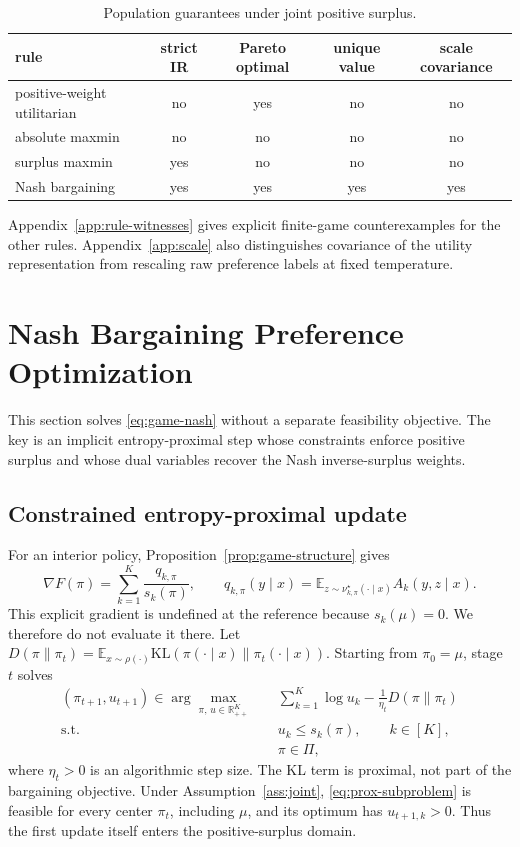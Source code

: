 \documentclass{article}
\theoremstyle{remark}
\theoremstyle{plain}
\newcommand{\KL}{\mathrm{KL}}
\newcommand{\E}{\mathbb{E}}
\newcommand{\R}{\mathbb{R}}
\begin{document}
\begin{table}[htbp]
\centering\footnotesize
\setlength{\tabcolsep}{4.4pt}
\caption{Population guarantees under joint positive surplus.}
\label{tab:rule-guarantees}
\begin{tabular}{lcccc}
\toprule
rule & strict IR & Pareto optimal & unique value & scale covariance\\
\midrule
positive-weight utilitarian & no & yes & no & no\\
absolute maxmin & no & no & no & no\\
surplus maxmin & yes & no & no & no\\
Nash bargaining & yes & yes & yes & yes\\
\bottomrule
\end{tabular}
\end{table}
Appendix~\ref{app:rule-witnesses} gives explicit finite-game counterexamples for the other rules. Appendix~\ref{app:scale} also distinguishes covariance of the utility representation from rescaling raw preference labels at fixed temperature.

\section{Nash Bargaining Preference Optimization}
\label{sec:algorithm}
This section solves \eqref{eq:game-nash} without a separate feasibility objective. The key is an implicit entropy-proximal step whose constraints enforce positive surplus and whose dual variables recover the Nash inverse-surplus weights.

\subsection{Constrained entropy-proximal update}
For an interior policy, Proposition~\ref{prop:game-structure} gives
\begin{equation}
\nabla F(\pi)
=
\sum_{k=1}^K\frac{q_{k,\pi}}{s_k(\pi)},
\qquad
q_{k,\pi}(y\mid x)
=\E_{z\sim\nu^\star_{k,\pi}(\cdot\mid x)}A_k(y,z\mid x).
\label{eq:nash-gradient}
\end{equation}
This explicit gradient is undefined at the reference because $s_k(\mu)=0$. We therefore do not evaluate it there. Let
$D(\pi\|\pi_t)=\E_{x\sim\rho(\cdot)}\KL(\pi(\cdot\mid x)\|\pi_t(\cdot\mid x))$.
Starting from $\pi_0=\mu$, stage $t$ solves
\begin{equation}
\begin{aligned}
(\pi_{t+1},u_{t+1})\in
\arg\max_{\pi,\,u\in\R_{++}^K}
\quad&\sum_{k=1}^K\log u_k-
\frac{1}{\eta_t}D(\pi\|\pi_t)\\
\text{s.t.}\quad&u_k\le s_k(\pi),\qquad k\in[K],\\
&\pi\in\Pi,
\end{aligned}
\label{eq:prox-subproblem}
\end{equation}
where $\eta_t>0$ is an algorithmic step size. The KL term is proximal, not part of the bargaining objective. Under Assumption~\ref{ass:joint}, \eqref{eq:prox-subproblem} is feasible for every center $\pi_t$, including $\mu$, and its optimum has $u_{t+1,k}>0$. Thus the first update itself enters the positive-surplus domain.
\end{document}
